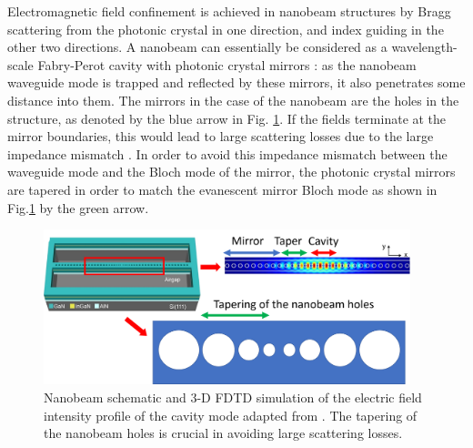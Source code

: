 Electromagnetic field confinement is achieved in nanobeam structures by Bragg scattering from the photonic crystal in one direction, and index guiding in the other two directions. A nanobeam can essentially be considered as a wavelength-scale Fabry-Perot cavity with photonic crystal mirrors \cite{Deotare2009}: as the nanobeam waveguide mode is trapped and reflected by these mirrors, it also penetrates some distance into them. The mirrors in the case of the nanobeam are the holes in the structure, as denoted by the blue arrow in Fig. \ref{1.16}. If the fields terminate at the mirror boundaries, this would lead to large scattering losses due to the large impedance mismatch \cite{Notomi2008}. In order to avoid this impedance mismatch between the waveguide mode and the Bloch mode of the mirror, the photonic crystal mirrors are tapered in order to match the evanescent mirror Bloch mode \cite{Lalanne2003} as shown in Fig.\ref{1.16} by the green arrow.


\begin{figure}[h]
	\centering
	\includegraphics[width=0.95\textwidth]{Figs/Ch1/nb1.png}
	\caption {Nanobeam schematic and 3-D FDTD simulation of the electric field intensity profile of the cavity mode adapted from \cite{Trivino2015}. The tapering of the nanobeam holes is crucial in avoiding large scattering losses. }
	\label{1.16}
\end{figure}
\FloatBarrier 


